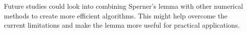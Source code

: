 \documentclass[a4paper,12pt]{article}
\begin{document}
Future studies could look into combining Sperner's lemma with other numerical methods to create more efficient algorithms.
This might help overcome the current limitations and make the lemma more useful for practical applications.


  
  
\end{document}
